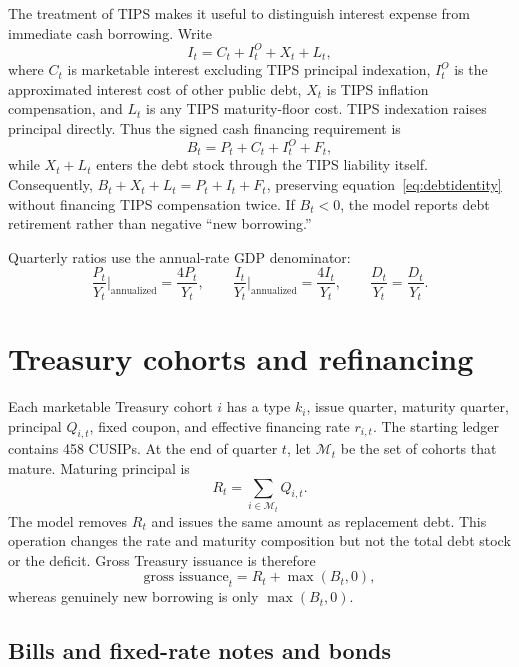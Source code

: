 \documentclass[10pt]{article}
\begin{document}
The treatment of TIPS makes it useful to distinguish interest expense from immediate cash
borrowing.  Write
\begin{equation}
 I_t=C_t+I^O_t+X_t+L_t,
\end{equation}
where $C_t$ is marketable interest excluding TIPS principal indexation, $I^O_t$ is the
approximated interest cost of other public debt, $X_t$ is TIPS inflation compensation, and
$L_t$ is any TIPS maturity-floor cost.  TIPS indexation raises principal directly.  Thus the
signed cash financing requirement is
\begin{equation}
 B_t=P_t+C_t+I^O_t+F_t,
\end{equation}
while $X_t+L_t$ enters the debt stock through the TIPS liability itself.  Consequently,
$B_t+X_t+L_t=P_t+I_t+F_t$, preserving equation~\eqref{eq:debtidentity} without financing
TIPS compensation twice.  If $B_t<0$, the model reports debt retirement rather than
negative ``new borrowing.''

Quarterly ratios use the annual-rate GDP denominator:
\begin{equation}
 \frac{P_t}{Y_t}\bigg|_{\mathrm{annualized}}=\frac{4P_t}{Y_t},
 \qquad
 \frac{I_t}{Y_t}\bigg|_{\mathrm{annualized}}=\frac{4I_t}{Y_t},
 \qquad
 \frac{D_t}{Y_t}=\frac{D_t}{Y_t}.
\end{equation}

\section{Treasury cohorts and refinancing}

Each marketable Treasury cohort $i$ has a type $k_i$, issue quarter, maturity quarter,
principal $Q_{i,t}$, fixed coupon, and effective financing rate $r_{i,t}$.  The starting
ledger contains 458 CUSIPs.  At the end of quarter $t$, let $\mathcal{M}_t$ be the set of
cohorts that mature.  Maturing principal is
\begin{equation}
 R_t=\sum_{i\in\mathcal{M}_t}Q_{i,t}.
\end{equation}
The model removes $R_t$ and issues the same amount as replacement debt.  This operation
changes the rate and maturity composition but not the total debt stock or the deficit.
Gross Treasury issuance is therefore
\begin{equation}
 \text{gross issuance}_t=R_t+\max(B_t,0),
\end{equation}
whereas genuinely new borrowing is only $\max(B_t,0)$.

\subsection*{Bills and fixed-rate notes and bonds}
\end{document}

